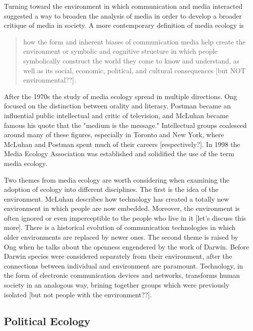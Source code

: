 Turning toward the environment in which communication and media interacted suggested a way to broaden the analysis of media in order to develop a broader critique of media in society. A more contemporary definition of media ecology is

\begin{quote}
how the form and inherent biases of communication media help create the environment or symbolic and cognitive structure in which people symbolically construct the world they come to know and understand, as well as its social, economic, political, and cultural consequences [but NOT environmental??]. \citep{lum_introduction:_2000}
\end{quote}

After the 1970s the study of media ecology spread in multiple directions. Ong focused on the distinction between orality and literacy, Postman became an influential public intellectual and critic of television, and McLuhan became famous his quote that the "medium is the message." Intellectual groups coalesced around many of these figures, especially in Toronto and New York, where McLuhan and Postman spent much of their careers [respectively?]. In 1998 the Media Ecology Association was established and solidified the use of the term media ecology. 

Two themes from media ecology are worth considering when examining the adoption of ecology into different disciplines. The first is the idea of the environment. McLuhan describes how technology has created a totally new environment in which people are now embedded. Moreover, the environment is often ignored or even imperceptible to the people who live in it [let's discuss this more]. There is a historical evolution of communication technologies in which older environments are replaced by newer ones. The second theme is raised by Ong when he talks about the openness engendered by the work of Darwin. Before Darwin species were considered separately from their environment, after the connections between individual and environment are paramount. Technology, in the form of electronic communication devices and networks, transforms human society in an analogous way, brining together groups which were previously isolated [but not people with the environment??].

\subsection{Political Ecology}

